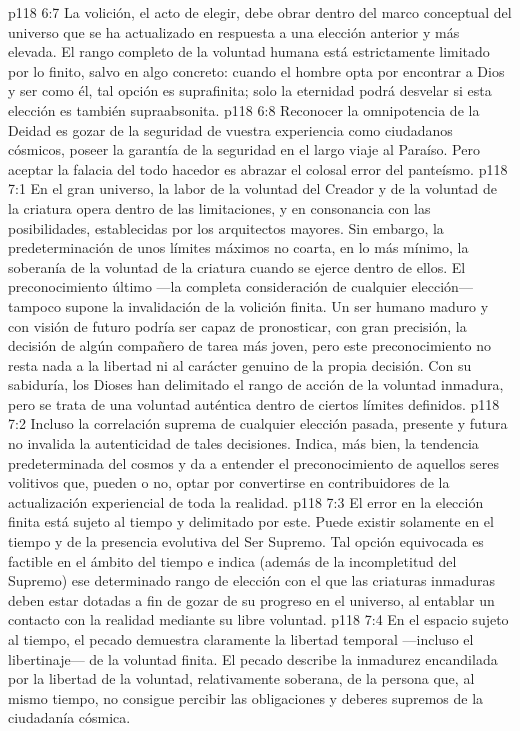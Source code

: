 \vs p118 6:7 La volición, el acto de elegir, debe obrar dentro del marco conceptual del universo que se ha actualizado en respuesta a una elección anterior y más elevada. El rango completo de la voluntad humana está estrictamente limitado por lo finito, salvo en algo concreto: cuando el hombre opta por encontrar a Dios y ser como él, tal opción es suprafinita; solo la eternidad podrá desvelar si esta elección es también supraabsonita.
\vs p118 6:8 \pc Reconocer la omnipotencia de la Deidad es gozar de la seguridad de vuestra experiencia como ciudadanos cósmicos, poseer la garantía de la seguridad en el largo viaje al Paraíso. Pero aceptar la falacia del todo hacedor es abrazar el colosal error del panteísmo.
\vs p118 7:1 En el gran universo, la labor de la voluntad del Creador y de la voluntad de la criatura opera dentro de las limitaciones, y en consonancia con las posibilidades, establecidas por los arquitectos mayores. Sin embargo, la predeterminación de unos límites máximos no coarta, en lo más mínimo, la soberanía de la voluntad de la criatura cuando se ejerce dentro de ellos. El preconocimiento último ---la completa consideración de cualquier elección--- tampoco supone la invalidación de la volición finita. Un ser humano maduro y con visión de futuro podría ser capaz de pronosticar, con gran precisión, la decisión de algún compañero de tarea más joven, pero este preconocimiento no resta nada a la libertad ni al carácter genuino de la propia decisión. Con su sabiduría, los Dioses han delimitado el rango de acción de la voluntad inmadura, pero se trata de una voluntad auténtica dentro de ciertos límites definidos.
\vs p118 7:2 Incluso la correlación suprema de cualquier elección pasada, presente y futura no invalida la autenticidad de tales decisiones. Indica, más bien, la tendencia predeterminada del cosmos y da a entender el preconocimiento de aquellos seres volitivos que, pueden o no, optar por convertirse en contribuidores de la actualización experiencial de toda la realidad.
\vs p118 7:3 \pc El error en la elección finita está sujeto al tiempo y delimitado por este. Puede existir solamente en el tiempo y  de la presencia evolutiva del Ser Supremo. Tal opción equivocada es factible en el ámbito del tiempo e indica (además de la incompletitud del Supremo) ese determinado rango de elección con el que las criaturas inmaduras deben estar dotadas a fin de gozar de su progreso en el universo, al entablar un contacto con la realidad mediante su libre voluntad.
\vs p118 7:4 En el espacio sujeto al tiempo, el pecado demuestra claramente la libertad temporal ---incluso el libertinaje--- de la voluntad finita. El pecado describe la inmadurez encandilada por la libertad de la voluntad, relativamente soberana, de la persona que, al mismo tiempo, no consigue percibir las obligaciones y deberes supremos de la ciudadanía cósmica.
